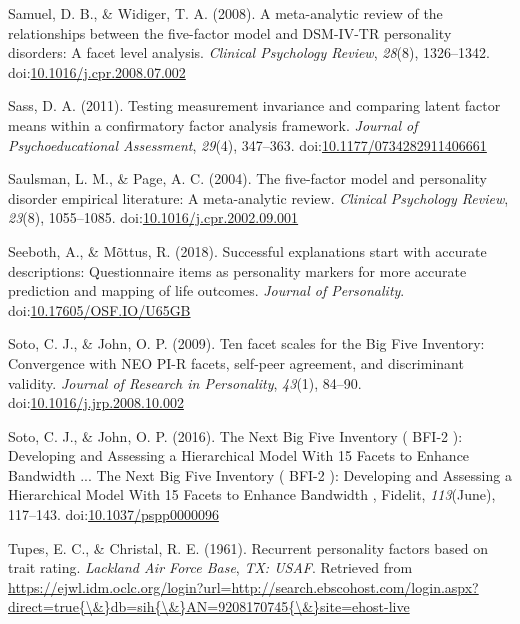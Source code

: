 \documentclass[,man,floatsintext]{apa6}
\theoremstyle{definition}
\theoremstyle{definition}
\theoremstyle{definition}
\theoremstyle{remark}
\begin{document}
\leavevmode\hypertarget{ref-SamuelWidiger2008}{}%
Samuel, D. B., \& Widiger, T. A. (2008). A meta-analytic review of the
relationships between the five-factor model and DSM-IV-TR personality
disorders: A facet level analysis. \emph{Clinical Psychology Review},
\emph{28}(8), 1326--1342.
doi:\href{https://doi.org/10.1016/j.cpr.2008.07.002}{10.1016/j.cpr.2008.07.002}

\leavevmode\hypertarget{ref-Sass2011}{}%
Sass, D. A. (2011). Testing measurement invariance and comparing latent
factor means within a confirmatory factor analysis framework.
\emph{Journal of Psychoeducational Assessment}, \emph{29}(4), 347--363.
doi:\href{https://doi.org/10.1177/0734282911406661}{10.1177/0734282911406661}

\leavevmode\hypertarget{ref-SaulsmanPage2004}{}%
Saulsman, L. M., \& Page, A. C. (2004). The five-factor model and
personality disorder empirical literature: A meta-analytic review.
\emph{Clinical Psychology Review}, \emph{23}(8), 1055--1085.
doi:\href{https://doi.org/10.1016/j.cpr.2002.09.001}{10.1016/j.cpr.2002.09.001}

\leavevmode\hypertarget{ref-Seeboth2018}{}%
Seeboth, A., \& Mõttus, R. (2018). Successful explanations start with
accurate descriptions: Questionnaire items as personality markers for
more accurate prediction and mapping of life outcomes. \emph{Journal of
Personality}.
doi:\href{https://doi.org/10.17605/OSF.IO/U65GB}{10.17605/OSF.IO/U65GB}

\leavevmode\hypertarget{ref-SotoJohn2009}{}%
Soto, C. J., \& John, O. P. (2009). Ten facet scales for the Big Five
Inventory: Convergence with NEO PI-R facets, self-peer agreement, and
discriminant validity. \emph{Journal of Research in Personality},
\emph{43}(1), 84--90.
doi:\href{https://doi.org/10.1016/j.jrp.2008.10.002}{10.1016/j.jrp.2008.10.002}

\leavevmode\hypertarget{ref-SotoJohn2016}{}%
Soto, C. J., \& John, O. P. (2016). The Next Big Five Inventory ( BFI-2
): Developing and Assessing a Hierarchical Model With 15 Facets to
Enhance Bandwidth ... The Next Big Five Inventory ( BFI-2 ): Developing
and Assessing a Hierarchical Model With 15 Facets to Enhance Bandwidth ,
Fidelit, \emph{113}(June), 117--143.
doi:\href{https://doi.org/10.1037/pspp0000096}{10.1037/pspp0000096}

\leavevmode\hypertarget{ref-TupesChristal1961}{}%
Tupes, E. C., \& Christal, R. E. (1961). Recurrent personality factors
based on trait rating. \emph{Lackland Air Force Base}, \emph{TX: USAF}.
Retrieved from
\href{https://ejwl.idm.oclc.org/login?url=http://search.ebscohost.com/login.aspx?direct=true\%7B/\&\%7Ddb=sih\%7B/\&\%7DAN=9208170745\%7B/\&\%7Dsite=ehost-live}{https://ejwl.idm.oclc.org/login?url=http://search.ebscohost.com/login.aspx?direct=true\{\textbackslash{}\&\}db=sih\{\textbackslash{}\&\}AN=9208170745\{\textbackslash{}\&\}site=ehost-live}
\end{document}
